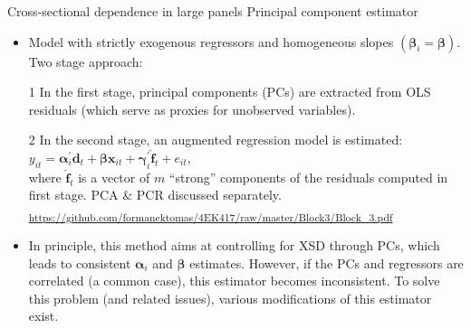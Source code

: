 \documentclass[usenames,dvipsnames]{beamer}
\begin{document}
\begin{frame}{Cross-sectional dependence in large panels}
Principal component estimator\\ \bigskip
\footnotesize
    \begin{itemize}
        \item Model with strictly exogenous regressors and homogeneous slopes $(\bm{\beta}_i=\bm{\beta})$. Two stage approach:
        \medskip
        \item[1] In the first stage, principal components (PCs) are extracted from OLS residuals (which serve as proxies for unobserved variables).
        \medskip
        \item[2] In the second stage, an augmented regression model is estimated:\\ \medskip
        $y_{it}=\bm{\alpha}_i^{\prime} \bm{d}_t + \bm{\beta} \bm{x}_{it} + \bm{\gamma}_i^{\prime} \hat{\bm{f}}_{t} + e_{it}$, \\ \medskip
        where $\hat{\bm{f}}_{t}$ is a vector of $m$ ``strong'' components of the residuals computed in first stage. PCA \& PCR discussed separately.
        \textsubscript{ \textcolor{Blue}{\url{https://github.com/formanektomas/4EK417/raw/master/Block3/Block_3.pdf}} }
        \bigskip \footnotesize
        \item In principle, this method aims at controlling for XSD through PCs, which leads to consistent $\bm{\alpha}_i$ and $\bm{\beta}$ estimates. However, if the PCs and regressors are correlated (a common case), this estimator becomes inconsistent. To solve this problem (and related issues), various modifications of this estimator exist.
        
    \end{itemize}
\end{frame}
\end{document}
